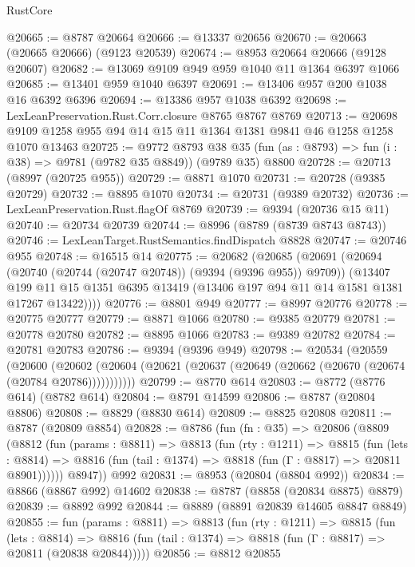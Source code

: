 \begin{lexlean}{RustCore}
\begin{coremodule}
@20665 := @8787 @20664
@20666 := @13337 @20656
@20670 := @20663 (@20665 @20666) (@9123 @20539)
@20674 := @8953 @20664 @20666 (@9128 @20607)
@20682 := @13069 @9109 @949 @959 @1040 @11 @1364 @6397 @1066
@20685 := @13401 @959 @1040 @6397
@20691 := @13406 @957 @200 @1038 @16 @6392 @6396
@20694 := @13386 @957 @1038 @6392
@20698 := LexLeanPreservation.Rust.Corr.closure @8765 @8767 @8769
@20713 := @20698 @9109 @1258 @955 @94 @14 @15 @11 @1364 @1381 @9841 @46 @1258 @1258 @1070 @13463
@20725 := @9772
    @8793
    @38
    @35
    (fun (as : @8793) => fun (i : @38) => @9781 (@9782 @35 @8849))
    (@9789 @35)
    @8800
@20728 := @20713 (@8997 (@20725 @955))
@20729 := @8871 @1070
@20731 := @20728 (@9385 @20729)
@20732 := @8895 @1070
@20734 := @20731 (@9389 @20732)
@20736 := LexLeanPreservation.Rust.flagOf @8769
@20739 := @9394 (@20736 @15 @11)
@20740 := @20734 @20739
@20744 := @8996 (@8789 (@8739 @8743 @8743))
@20746 := LexLeanTarget.RustSemantics.findDispatch @8828
@20747 := @20746 @955
@20748 := @16515 @14
@20775 := @20682
    (@20685
      (@20691
        (@20694 (@20740 (@20744 (@20747 @20748)) (@9394 (@9396 @955)) @9709))
        (@13407
          @199
          @11
          @15
          @1351
          @6395
          @13419
          (@13406 @197 @94 @11 @14 @1581 @1381 @17267 @13422))))
@20776 := @8801 @949
@20777 := @8997 @20776
@20778 := @20775 @20777
@20779 := @8871 @1066
@20780 := @9385 @20779
@20781 := @20778 @20780
@20782 := @8895 @1066
@20783 := @9389 @20782
@20784 := @20781 @20783
@20786 := @9394 (@9396 @949)
@20798 := @20534
    (@20559
      (@20600
        (@20602 (@20604 (@20621 (@20637 (@20649 (@20662 (@20670 (@20674 (@20784 @20786)))))))))))
@20799 := @8770 @614
@20803 := @8772 (@8776 @614) (@8782 @614)
@20804 := @8791 @14599
@20806 := @8787 (@20804 @8806)
@20808 := @8829 (@8830 @614)
@20809 := @8825 @20808
@20811 := @8787 (@20809 @8854)
@20828 := @8786
    (fun (fn : @35) =>
    @20806
      (@8809
        (@8812
          (fun (params : @8811) =>
          @8813
            (fun (rty : @1211) =>
            @8815
              (fun (lets : @8814) =>
              @8816 (fun (tail : @1374) => @8818 (fun (Γ : @8817) => @20811 @8901))))))
        @8947))
    @992
@20831 := @8953 (@20804 (@8804 @992))
@20834 := @8866 (@8867 @992) @14602
@20838 := @8787 (@8858 (@20834 @8875) @8879)
@20839 := @8892 @992
@20844 := @8889 (@8891 @20839 @14605 @8847 @8849)
@20855 := fun (params : @8811) =>
  @8813
    (fun (rty : @1211) =>
    @8815
      (fun (lets : @8814) =>
      @8816 (fun (tail : @1374) => @8818 (fun (Γ : @8817) => @20811 (@20838 @20844)))))
@20856 := @8812 @20855

\end{coremodule}
\end{lexlean}

